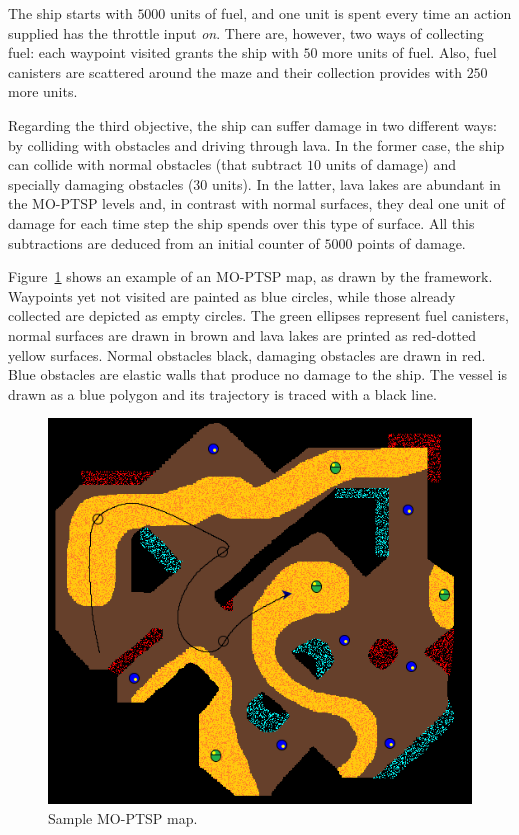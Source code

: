 \documentclass[journal]{IEEEtran}
\begin{document}
The ship starts with $5000$ units of fuel, and one unit is spent every time an action supplied has the throttle input \textit{on}. There are, however, two ways of collecting fuel: each waypoint visited grants the ship with $50$ more units of fuel. Also, fuel canisters are scattered around the maze and their collection provides with $250$ more units.

Regarding the third objective, the ship can suffer damage in two different ways: by colliding with obstacles and driving through lava. In the former case, the ship can collide with normal obstacles (that subtract $10$ units of damage) and specially damaging obstacles ($30$ units). In the latter, lava lakes are abundant in the MO-PTSP levels and, in contrast with normal surfaces, they deal one unit of damage for each time step the ship spends over this type of surface. All this subtractions are deduced from an initial counter of $5000$ points of damage.

Figure~\ref{fig:sampleMap} shows an example of an MO-PTSP map, as drawn by the framework. Waypoints yet not visited are painted as blue circles, while those already collected are depicted as empty circles. The green ellipses represent fuel canisters, normal surfaces are drawn in brown and lava lakes are printed as red-dotted yellow surfaces. Normal obstacles black, damaging obstacles are drawn in red. Blue obstacles are elastic walls that produce no damage to the ship. The vessel is drawn as a blue polygon and its trajectory is traced with a black line.

\begin{figure} [!t]
	\begin{center}
	\includegraphics[width=0.7\columnwidth]{img/moptspmap}
	\caption{Sample MO-PTSP map.}
	\label{fig:sampleMap}
	\end{center}
\end{figure}
\end{document}
